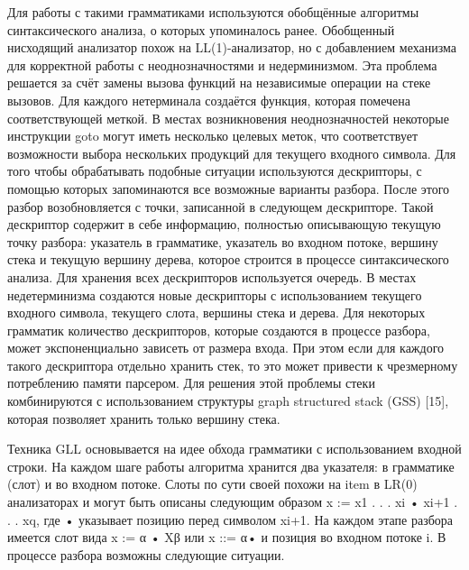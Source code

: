 \documentclass{matmex-diploma-custom}
\begin{document}
Для работы с такими грамматиками используются обобщённые алгоритмы синтаксического анализа, о которых упоминалось ранее. Обобщенный нисходящий анализатор похож на LL(1)-анализатор, но с добавлением механизма для корректной работы с неоднозначностями и недерминизмом. Эта проблема решается за счёт замены вызова функций на независимые операции на стеке вызовов. Для каждого нетерминала создаётся функция, которая помечена соответствующей меткой. В местах возникновения неоднозначностей некоторые инструкции goto могут иметь несколько целевых меток, что соответствует возможности выбора нескольких продукций для текущего входного символа. Для того чтобы обрабатывать подобные ситуации используются дескрипторы, с помощью которых запоминаются все возможные варианты разбора. После этого разбор возобновляется с точки, записанной в следующем дескрипторе. Такой дескриптор  содержит в себе информацию, полностью описывающую текущую точку разбора: указатель в грамматике, указатель во входном потоке, вершину стека и текущую вершину дерева, которое строится в процессе синтаксического анализа. Для хранения всех дескрипторов используется очередь. В местах недетерминизма создаются новые дескрипторы с использованием текущего входного символа, текущего слота, вершины стека и дерева. Для некоторых грамматик количество дескрипторов, которые создаются в процессе разбора, может экспоненциально зависеть от размера входа. При этом если для каждого такого дескриптора отдельно хранить стек, то это может привести к чрезмерному потреблению памяти парсером. Для решения этой проблемы стеки комбинируются с использованием структуры graph structured stack (GSS) [15], которая позволяет хранить только вершину стека.

Техника GLL основывается на идее обхода грамматики с использованием входной строки. На каждом шаге работы алгоритма хранится два указателя: в грамматике (слот) и во входном потоке. Слоты по сути своей похожи на item в  LR(0) анализаторах и могут быть описаны следующим образом x := x1 . . . xi • xi+1 . . . xq, где • указывает позицию перед символом xi+1. На каждом этапе разбора имеется слот вида x := α • Xβ или x ::= α• и позиция во входном потоке i. В процессе разбора возможны следующие ситуации.
\end{document}

